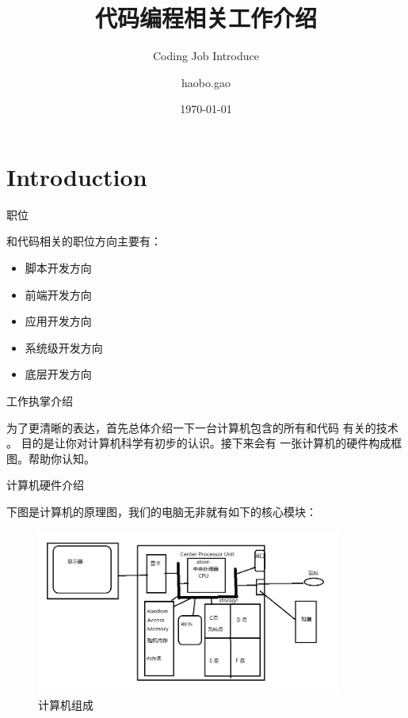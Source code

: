 \documentclass[10pt]{beamer}
\title{代码编程相关工作介绍}
\subtitle{Coding Job Introduce}
\date{\today}
\author{haobo.gao}
\institute{ZhengZhou}
\begin{document}
\begin{frame}
	\titlepage
\end{frame}



\section{Introduction}

\begin{frame}[fragile]{职位}

	和代码相关的职位方向主要有：
	\begin{itemize}
		\item 脚本开发方向
		\item 前端开发方向
		\item 应用开发方向
		\item 系统级开发方向
		\item 底层开发方向
	\end{itemize}
\end{frame}

\begin{frame}[fragile]{工作执掌介绍}

		为了更清晰的表达，首先总体介绍一下一台计算机包含的所有和代码
	有关的技术  。 目的是让你对计算机科学有初步的认识。接下来会有
	一张计算机的硬件构成框图。帮助你认知。


\end{frame}

\begin{frame}[fragile]{计算机硬件介绍}

	下图是计算机的原理图，我们的电脑无非就有如下的核心模块：
	\begin{figure}[htbp]
	\begin{center}
	\includegraphics[width=10cm]{img/cmptfrom}
	\caption{计算机组成}
	\label{cmptfrom}
	\end{center}
	\vspace{-0.5em}
	\end{figure}
	\end{frame}
\end{document}
